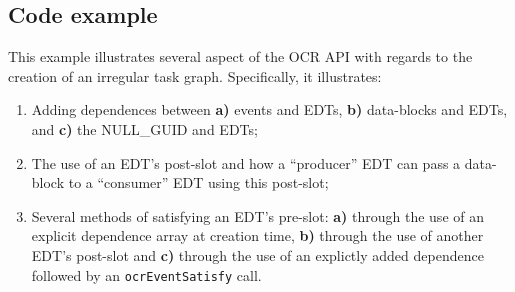 \subsection{Code example}
This example illustrates several aspect of the OCR API with regards to
the creation of an irregular task graph. Specifically, it illustrates:
\begin{enumerate}
\item{Adding dependences between {\bf a)} events and EDTs, {\bf b)}
    data-blocks and EDTs, and {\bf c)} the NULL\_GUID and EDTs;}
\item{The use of an EDT's post-slot and how a ``producer'' EDT can
    pass a data-block to a ``consumer'' EDT using this post-slot;}
\item{Several methods of satisfying an EDT's pre-slot: {\bf a)}
    through the use of an explicit dependence array at creation time,
    {\bf b)} through the use of another EDT's post-slot and {\bf c)}
    through the use of an explictly added dependence followed by an
    \texttt{ocrEventSatisfy} call.}
\end{enumerate}
